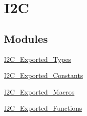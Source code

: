 \hypertarget{group__I2C}{
\section{I2C}
\label{group__I2C}
}
\subsection*{Modules}
\begin{DoxyCompactItemize}
\item 
\hyperlink{group__I2C__Exported__Types}{I2C\_\-Exported\_\-Types}
\item 
\hyperlink{group__I2C__Exported__Constants}{I2C\_\-Exported\_\-Constants}
\item 
\hyperlink{group__I2C__Exported__Macros}{I2C\_\-Exported\_\-Macros}
\item 
\hyperlink{group__I2C__Exported__Functions}{I2C\_\-Exported\_\-Functions}
\end{DoxyCompactItemize}
